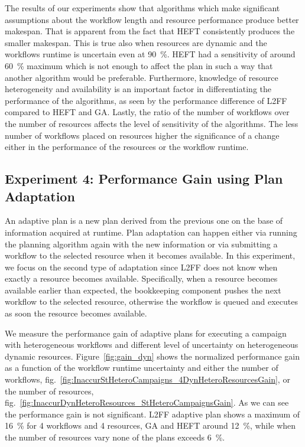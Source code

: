 The results of our experiments show that algorithms which make significant assumptions about the workflow length and resource performance produce better makespan.
That is apparent from the fact that HEFT consistently produces the smaller makespan.
This is true also when resources are dynamic and the workflows runtime is uncertain even at 90~\%.
HEFT had a sensitivity of around 60~\% maximum which is not enough to affect the plan in such a way that another algorithm would be preferable.
Furthermore, knowledge of resource heterogeneity and availability is an important factor in differentiating the performance of the algorithms, as seen by the performance difference of L2FF compared to HEFT and GA.
Lastly, the ratio of the number of workflows over the number of resources affects the level of sensitivity of the algorithms.
The less number of workflows placed on resources higher the significance of a change either in the performance of the resources or the workflow runtime.
%

\subsection{Experiment 4: Performance Gain using Plan Adaptation}

An adaptive plan is a new plan derived from the previous one on the base of information acquired at runtime.
Plan adaptation can happen either via running the planning algorithm again with the new information or via submitting a workflow to the selected resource when it becomes available.
In this experiment, we focus on the second type of adaptation since L2FF does not know when exactly a resource becomes available.
Specifically, when a resource becomes available earlier than expected, the bookkeeping component pushes the next workflow to the selected resource, otherwise the workflow is queued and executes as soon the resource becomes available.

We measure the performance gain of adaptive plans for executing a campaign with heterogeneous workflows and different level of uncertainty on heterogeneous dynamic resources.
Figure~\ref{fig:gain_dyn} shows the normalized performance gain as a function of the workflow runtime uncertainty and either the number of workflows, fig.~\ref{fig:InaccurStHeteroCampaigns_4DynHeteroResourcesGain}, or the number of resources, fig.~\ref{fig:InaccurDynHeteroResources_StHeteroCampaignsGain}.
As we can see the performance gain is not significant.
L2FF adaptive plan shows a maximum of 16~\% for 4 workflows and 4 resources, GA and HEFT around 12~\%, while when the number of resources vary none of the plans exceeds 6~\%.


